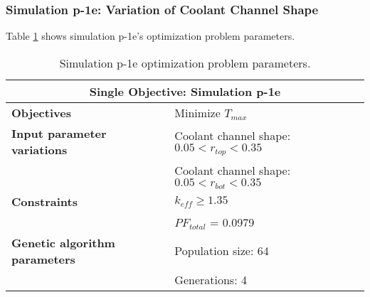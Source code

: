 \subsubsection{Simulation p-1e: Variation of Coolant Channel Shape}
Table \ref{tab:simulationp1e} shows simulation p-1e's optimization problem parameters. 
\begin{table}[htbp!]
    \centering
    \onehalfspacing
    \caption{Simulation p-1e optimization problem parameters.}
	\label{tab:simulationp1e}
    \footnotesize
    \begin{tabular}{l|p{6.5cm}}
    \hline 
    \multicolumn{2}{c}{\textbf{Single Objective: Simulation p-1e}} \\
    \hline 
    \textbf{Objectives} & Minimize $T_{max}$ \\
    \hline 
    \textbf{Input parameter variations} 
    & Coolant channel shape: $0.05<r_{top}<0.35$ \\
    & Coolant channel shape: $0.05<r_{bot}<0.35$ \\
    \hline
    \textbf{Constraints} & $k_{eff} \geq 1.35$\\ 
    & $PF_{total}$ = 0.0979\\
    \hline 
    \textbf{Genetic algorithm parameters} & Population size: 64 \\
    & Generations: 4 \\
    \hline
    \end{tabular}
\end{table}

